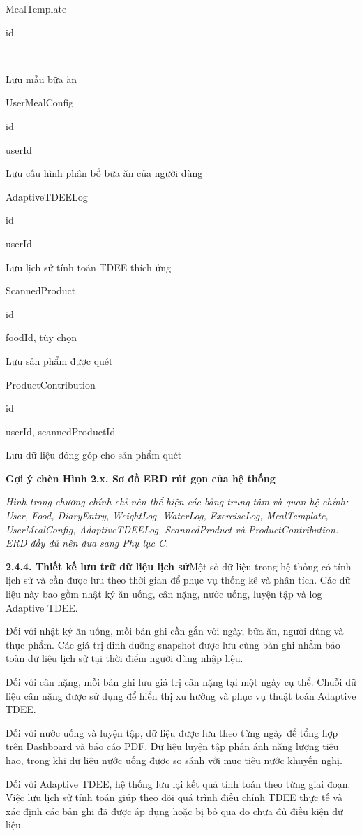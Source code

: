 MealTemplate

id

—

Lưu mẫu bữa ăn

UserMealConfig

id

userId

Lưu cấu hình phân bổ bữa ăn của người dùng

AdaptiveTDEELog

id

userId

Lưu lịch sử tính toán TDEE thích ứng

ScannedProduct

id

foodId, tùy chọn

Lưu sản phẩm được quét

ProductContribution

id

userId, scannedProductId

Lưu dữ liệu đóng góp cho sản phẩm quét

\textbf{Gợi ý chèn Hình 2.x. Sơ đồ ERD rút gọn của hệ thống}

\textit{Hình trong chương chính chỉ nên thể hiện các bảng trung tâm và quan hệ chính: User, Food, DiaryEntry, WeightLog, WaterLog, ExerciseLog, MealTemplate, UserMealConfig, AdaptiveTDEELog, ScannedProduct và ProductContribution. ERD đầy đủ nên đưa sang Phụ lục C.}

\textbf{2.4.4. Thiết kế lưu trữ dữ liệu lịch sử}Một số dữ liệu trong hệ thống có tính lịch sử và cần được lưu theo thời gian để phục vụ thống kê và phân tích. Các dữ liệu này bao gồm nhật ký ăn uống, cân nặng, nước uống, luyện tập và log Adaptive TDEE.

Đối với nhật ký ăn uống, mỗi bản ghi cần gắn với ngày, bữa ăn, người dùng và thực phẩm. Các giá trị dinh dưỡng snapshot được lưu cùng bản ghi nhằm bảo toàn dữ liệu lịch sử tại thời điểm người dùng nhập liệu.

Đối với cân nặng, mỗi bản ghi lưu giá trị cân nặng tại một ngày cụ thể. Chuỗi dữ liệu cân nặng được sử dụng để hiển thị xu hướng và phục vụ thuật toán Adaptive TDEE.

Đối với nước uống và luyện tập, dữ liệu được lưu theo từng ngày để tổng hợp trên Dashboard và báo cáo PDF. Dữ liệu luyện tập phản ánh năng lượng tiêu hao, trong khi dữ liệu nước uống được so sánh với mục tiêu nước khuyến nghị.

Đối với Adaptive TDEE, hệ thống lưu lại kết quả tính toán theo từng giai đoạn. Việc lưu lịch sử tính toán giúp theo dõi quá trình điều chỉnh TDEE thực tế và xác định các bản ghi đã được áp dụng hoặc bị bỏ qua do chưa đủ điều kiện dữ liệu.

